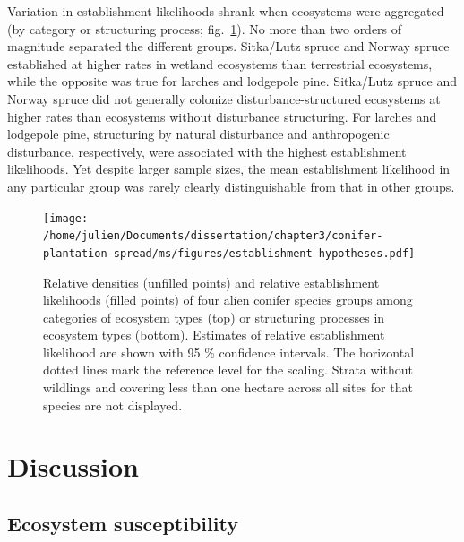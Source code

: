 \documentclass[
]{article}
\begin{document}
Variation in establishment likelihoods shrank when ecosystems were aggregated (by category or structuring process; fig.~\ref{fig:establishment-hypotheses}).
No more than two orders of magnitude separated the different groups.
Sitka/Lutz spruce and Norway spruce established at higher rates in wetland ecosystems than terrestrial ecosystems, while the opposite was true for larches and lodgepole pine.
Sitka/Lutz spruce and Norway spruce did not generally colonize disturbance-structured ecosystems at higher rates than ecosystems without disturbance structuring.
For larches and lodgepole pine, structuring by natural disturbance and anthropogenic disturbance, respectively, were associated with the highest establishment likelihoods.
Yet despite larger sample sizes, the mean establishment likelihood in any particular group was rarely clearly distinguishable from that in other groups.

\newpage
\begin{landscape}

\begin{figure}
\centering
\texttt{[image: /home/julien/Documents/dissertation/chapter3/conifer-plantation-spread/ms/figures/establishment-hypotheses.pdf]}
\caption{\label{fig:establishment-hypotheses}Relative densities (unfilled points) and relative establishment likelihoods (filled points) of four alien conifer species groups among categories of ecosystem types (top) or structuring processes in ecosystem types (bottom). Estimates of relative establishment likelihood are shown with 95 \% confidence intervals. The horizontal dotted lines mark the reference level for the scaling. Strata without wildlings and covering less than one hectare across all sites for that species are not displayed.}
\end{figure}

\end{landscape}

\newpage

\hypertarget{discussion}{%
\section{Discussion}\label{discussion}}

\hypertarget{ecosystem-susceptibility}{%
\subsection{Ecosystem susceptibility}\label{ecosystem-susceptibility}}
\end{document}
